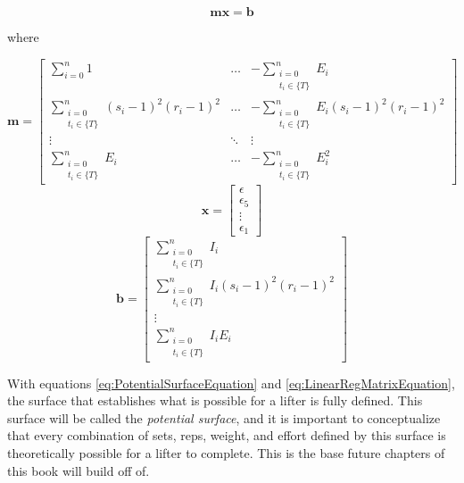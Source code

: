 \begin{equation}
    \label{eq:LinearRegMatrixEquation}
	\mathbf{mx=b}
\end{equation}
\centerline{where}
\begin{equation*}
    \mathbf{m}=\left[
    \begin{matrix}
        \sum_{i=0}^n 1 &
        \dots &
        -\sum_{\substack{i=0\\ t_i\in \{ T \}}}^n E_i \\

        \sum_{\substack{i=0\\ t_i\in \{ T \}}}^n (s_i-1)^2(r_i-1)^2 &
        \dots &
        -\sum_{\substack{i=0\\ t_i\in \{ T \}}}^n E_i (s_i-1)^2(r_i-1)^2\\

        \vdots &
        \ddots &
        \vdots \\
        
        \sum_{\substack{i=0\\ t_i\in \{ T \}}}^n E_i &
        \dots &
        -\sum_{\substack{i=0\\ t_i\in \{ T \}}}^n E_i^2
    \end{matrix}
    \right]
\end{equation*}
\begin{equation*}
    \mathbf{x}=\left[
    \begin{matrix}
        \epsilon \\ \epsilon_5 \\ \vdots \\ \epsilon_1
    \end{matrix}
    \right]
\end{equation*}
\begin{equation*}
    \mathbf{b}=\left[
    \begin{matrix}
        \sum_{\substack{i=0\\ t_i\in \{ T \}}}^n I_i \\
        \sum_{\substack{i=0\\ t_i\in \{ T \}}}^n I_i(s_i-1)^2(r_i-1)^2 \\
        \vdots \\
        \sum_{\substack{i=0\\ t_i\in \{ T \}}}^n I_i E_i
    \end{matrix}
    \right]
\end{equation*}

With equations \ref{eq:PotentialSurfaceEquation} and \ref{eq:LinearRegMatrixEquation}, the surface that establishes what is possible for a lifter is fully defined. This surface will be called the \textit{potential surface}, and it is important to conceptualize that every combination of sets, reps, weight, and effort defined by this surface is theoretically possible for a lifter to complete. This is the base future chapters of this book will build off of.

